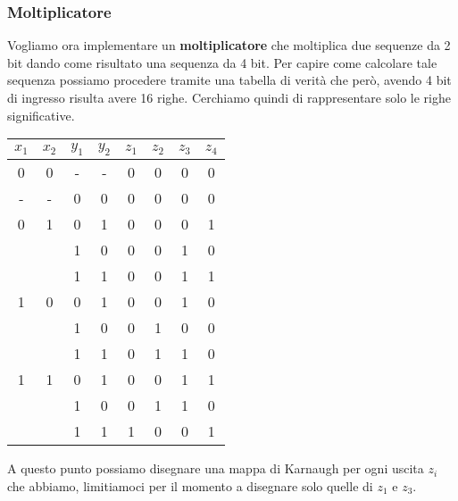 \subsubsection{Moltiplicatore}
Vogliamo ora implementare un \textbf{moltiplicatore} che moltiplica due sequenze da 2 bit dando
come risultato una sequenza da 4 bit. Per capire come calcolare tale sequenza possiamo procedere
tramite una tabella di verità che però, avendo 4 bit di ingresso risulta avere 16 righe. Cerchiamo
quindi di rappresentare solo le righe significative.
\begin{center}
	\begin{tabular}{c c c c | c c c c}
		$x_1$ & $x_2$ & $y_1$ & $y_2$ & $z_1$ & $z_2$ & $z_3$ & $z_4$ \\ \hline
		0     & 0     & -     & -     & 0     & 0     & 0     & 0     \\
		-     & -     & 0     & 0     & 0     & 0     & 0     & 0     \\ \hline
		0     & 1     & 0     & 1     & 0     & 0     & 0     & 1     \\
		      &       & 1     & 0     & 0     & 0     & 1     & 0     \\
		      &       & 1     & 1     & 0     & 0     & 1     & 1     \\ \hline
		1     & 0     & 0     & 1     & 0     & 0     & 1     & 0     \\
		      &       & 1     & 0     & 0     & 1     & 0     & 0     \\
		      &       & 1     & 1     & 0     & 1     & 1     & 0     \\ \hline
		1     & 1     & 0     & 1     & 0     & 0     & 1     & 1     \\
		      &       & 1     & 0     & 0     & 1     & 1     & 0     \\
		      &       & 1     & 1     & 1     & 0     & 0     & 1     \\
	\end{tabular}
\end{center}
A questo punto possiamo disegnare una mappa di Karnaugh per ogni uscita $z_i$ che abbiamo,
limitiamoci per il momento a disegnare solo quelle di $z_1$ e $z_3$.
\begin{figure}[!h]\centering
{}
\end{figure}


